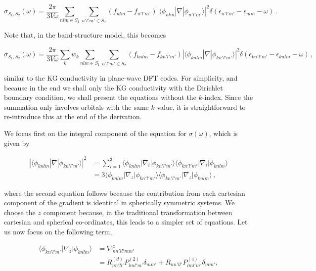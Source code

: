 \documentclass[9pt]{article}
\begin{document}
\begin{equation}
\sigma_{S_1,S_2}(\omega) = \frac{2\pi}{3V\omega} \sum_{nlm\in S_1} \sum_{n'l'm'\in S_2} (f_{nlm} - f_{n'l'm'}) |\langle \phi_{nlm} | \nabla | \phi_{n'l'm'} \rangle|^2 \delta (\epsilon_{n'l'm'} - \epsilon_{nlm} - \omega)\,.
\end{equation}

Note that, in the band-structure model, this becomes

\begin{equation}
\sigma_{S_1,S_2} (\omega) = \frac{2\pi}{3V\omega} \sum_k w_k \sum_{nlm\in S_1} \sum_{n'l'm'\in S_2} (f_{knlm} - f_{kn'l'm'}) |\langle \phi_{knlm} | \nabla | \phi_{kn'l'm'} \rangle|^2 \delta (\epsilon_{kn'l'm'} - \epsilon_{knlm} - \omega)\,,
\end{equation}

similar to the KG conductivity in plane-wave DFT codes. For simplicity,
and because in the end we shall only the KG conductivity with the
Dirichlet boundary condition, we shall present the equations without the
\(k\)-index. Since the summation only involves orbitals with the same
\(k\)-value, it is straightforward to re-introduce this at the end of
the derivation.

We focus first on the integral component of the equation for
\(\sigma(\omega)\), which is given by

\begin{align}
|\langle \phi_{knlm} | \nabla | \phi_{kn'l'm'} \rangle|^2 &= \sum_{i=1}^3 \langle \phi_{knlm} | \nabla_i | \phi_{kn'l'm'} \rangle \langle \phi_{kn'l'm'} | \nabla_i | \phi_{knlm} \rangle \\
&=3 \langle \phi_{knlm} | \nabla_z | \phi_{kn'l'm'} \rangle \langle \phi_{kn'l'm'} | \nabla_z | \phi_{knlm} \rangle\,,
\end{align}

where the second equation follows because the contribution from each
cartesian component of the gradient is identical in spherically
symmetric systems. We choose the \(z\) component because, in the
traditional transformation between cartesian and spherical co-ordinates,
this leads to a simpler set of equations. Let us now focus on the
following term,

\begin{align}
\langle \phi_{kn'l'm'} | \nabla_z | \phi_{knlm} \rangle&= \nabla_{nn'll'mm'}^z \\
&=R^{(d)}_{nn'll'} P^{(2)}_{lml'm'} \delta_{mm'} + R_{nn'll'} P^{(4)}_{lml'm'} \delta_{mm'},
\end{align}
\end{document}
